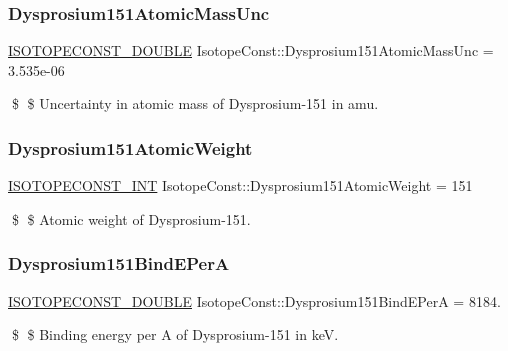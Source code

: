 \subsubsection{\texorpdfstring{Dysprosium151\+Atomic\+Mass\+Unc}{Dysprosium151AtomicMassUnc}}
{\footnotesize\ttfamily \mbox{\hyperlink{group___isotope_const-_macros_ga8f45a7272ce02c0b4c65c44636ed719a}{I\+S\+O\+T\+O\+P\+E\+C\+O\+N\+S\+T\+\_\+\+D\+O\+U\+B\+LE}} Isotope\+Const\+::\+Dysprosium151\+Atomic\+Mass\+Unc = 3.\+535e-\/06}

\$ \$ Uncertainty in atomic mass of Dysprosium-\/151 in amu. \mbox{\label{group___isotope_const-_dysprosium-_dy151_ga7eb979b188779bd920bdc8b1ee58d8c6}} 
\subsubsection{\texorpdfstring{Dysprosium151\+Atomic\+Weight}{Dysprosium151AtomicWeight}}
{\footnotesize\ttfamily \mbox{\hyperlink{group___isotope_const-_macros_ga5f18360b3e99483a35c32d789e62621c}{I\+S\+O\+T\+O\+P\+E\+C\+O\+N\+S\+T\+\_\+\+I\+NT}} Isotope\+Const\+::\+Dysprosium151\+Atomic\+Weight = 151}

\$ \$ Atomic weight of Dysprosium-\/151. \mbox{\label{group___isotope_const-_dysprosium-_dy151_gaebf35b00c4e9bb5856ac24633f449aee}} 
\subsubsection{\texorpdfstring{Dysprosium151\+Bind\+E\+PerA}{Dysprosium151BindEPerA}}
{\footnotesize\ttfamily \mbox{\hyperlink{group___isotope_const-_macros_ga8f45a7272ce02c0b4c65c44636ed719a}{I\+S\+O\+T\+O\+P\+E\+C\+O\+N\+S\+T\+\_\+\+D\+O\+U\+B\+LE}} Isotope\+Const\+::\+Dysprosium151\+Bind\+E\+PerA = 8184.}

\$ \$ Binding energy per A of Dysprosium-\/151 in keV. \mbox{\label{group___isotope_const-_dysprosium-_dy151_gaaae676646c5ebbd2c68e343aac071595}} 
